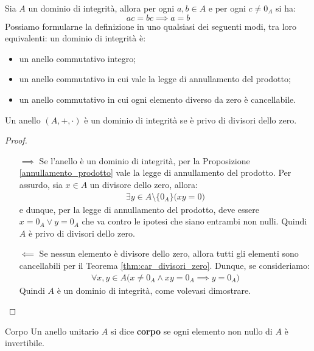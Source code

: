 \begin{propbox}
	Sia $A$ un dominio di integrità, allora per ogni $a,b \in A$ e per ogni $c \neq 0_{A}$ si ha:
	\begin{equation}
		ac=bc  \implies a=b
	\end{equation}
	Possiamo formularne la definizione in uno qualsiasi dei seguenti modi, tra loro equivalenti: un dominio
	di integrità è:
	\begin{itemize}
		\item un anello commutativo integro;
		\item un anello commutativo in cui vale la legge di annullamento del prodotto;
		\item un anello commutativo in cui ogni elemento diverso da zero è cancellabile.
	\end{itemize}
\end{propbox}
\begin{teorbox}
	Un anello $(A,+,\cdot)$ è un dominio di integrità se è privo di divisori dello zero.
\end{teorbox}
\begin{proof}
	\begin{itemize}
		\item[$\implies$] Se l'anello è un dominio di integrità, per la Proposizione \ref{annullamento_prodotto}  vale la legge di annullamento del prodotto. Per assurdo, sia $x \in A$ un divisore dello zero, allora:
		\begin{align*}
			\exists y \in A \setminus \{0_{A}\}\bigl(xy=0\bigr)
		\end{align*}
	e dunque, per la legge di annullamento del prodotto, deve essere $x=0_{A} \lor y=0_{A}$ che va contro le ipotesi che siano entrambi non nulli. Quindi $A$ è privo di divisori dello zero.
	\item[$\impliedby$] Se nessun elemento è divisore dello zero, allora tutti gli elementi sono cancellabili per il Teorema \ref{thm:car_divisori_zero}. Dunque, se consideriamo:
	\begin{align*}
		\forall x,y \in A \bigl( x \neq 0_{A} \land xy = 0_{A} \implies y = 0_{A} \bigr)
	\end{align*}
Quindi $A$ è un dominio di integrità, come volevasi dimostrare.
	\end{itemize}
\end{proof}
\begin{defbox}{Corpo}
	Un anello unitario $A$ si dice \textbf{corpo} se ogni elemento non nullo di $A$ è invertibile.
\end{defbox}

